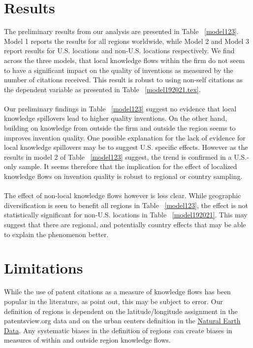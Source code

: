 \documentclass[10pt,letterpaper]{article}
\begin{document}
\section*{Results}
The preliminary results from our analysis are presented in Table ~\ref{model123}. Model 1 reports the results for all regions worldwide, while Model 2 and Model 3 report results for U.S. locations and non-U.S. locations respectively. We find across the three models, that local knowledge flows within the firm do not seem to have a significant impact on the quality of inventions as measured by the number of citations received. This result is robust to using non-self citations as the dependent variable as presented in Table ~\ref{model192021.tex}. 
\\\\
Our preliminary findings in Table ~\ref{model123} suggest no evidence that local knowledge spillovers lead to higher quality inventions. On the other hand, building on knowledge from outside the firm and outside the region seems to improves invention quality. One possible explanation for the lack of evidence for local knowledge spillovers may be to suggest U.S. specific effects. However as the results in model 2 of Table ~\ref{model123} suggest, the trend is confirmed in a U.S.-only sample. It seems therefore that the implication for the effect of localized knowledge flows on invention quality is robust to regional or country sampling. 
\\\\
The effect of non-local knowledge flows however is less clear. While geographic diversification is seen to benefit all regions in Table ~\ref{model123}, the effect is not statistically significant for non-U.S. locations in Table ~\ref{model192021}. This may suggest that there are regional, and potentially country effects that may be able to explain the phenomenon better.

\section*{Limitations}
While the use of patent citations as a measure of knowledge flows has been popular in the literature, as \cite{Arora2017} point out, this may be subject to error. Our definition of regions is dependent on the latitude/longitude assignment in the patentsview.org data and on the urban centers definition in the \href{http://www.naturalearthdata.com/downloads/10m-cultural-vectors/}{Natural Earth Data}. Any systematic biases in the definition of regions can create biases in measures of within and outside region knowledge flows. 
\end{document}
